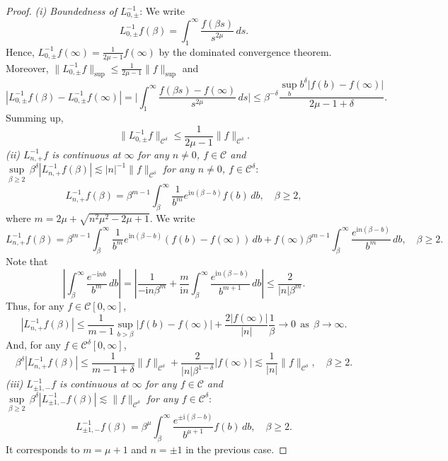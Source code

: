 \documentclass[10pt,a4paper]{amsart}
\newcommand{\abs}[1]{\left\lvert #1 \right\rvert}
\newcommand{\mcal}{\mathcal}
\newcommand{\norm}[1]{\lVert #1 \rVert}
\begin{document}
\begin{proof}
\textit{(i) Boundedness of $L_{0,\pm}^{-1}$}: We write
\[L_{0,\pm}^{-1} f(\beta) = \int_1^\infty \frac{f(\beta s)}{s^{2\mu}} \,ds.\]
Hence, $L_{0,\pm}^{-1} f(\infty) = \frac{1}{2\mu-1} f(\infty)$ by the dominated convergence theorem. Moreover, $\norm{L_{0,\pm}^{-1} f}_{\sup} \leq \frac{1}{2\mu-1} \norm{f}_{\sup}$ and
\[|L_{0,\pm}^{-1} f(\beta) - L_{0,\pm}^{-1} f(\infty)| = \bigg|\int_1^\infty \frac{f(\beta s) - f(\infty)}{s^{2\mu}} \,ds \bigg| \leq \beta^{-\delta} \frac{\sup_{b} b^\delta |f(b) - f(\infty)| }{2\mu -1+ \delta}.\]
Summing up,
\[\norm{L_{0,\pm}^{-1} f}_{\mcal{C}^\delta} \leq \frac{1}{2\mu - 1} \norm{f}_{\mcal{C}^\delta}.\]
\textit{(ii) $L_{n,+}^{-1} f$ is continuous at $\infty$ for any $n\neq 0$, $f\in \mcal{C}$ and $\underset{\beta \geq 2}{\sup} \,\beta^\delta |L_{n,+}^{-1} f(\beta)| \lesssim |n|^{-1} \norm{f}_{\mcal{C}^\delta}$ for any $n\neq 0$, $f\in\mcal{C}^\delta$}:
\[L_{n,+}^{-1} f(\beta) = \beta^{m - 1} \int_\beta^\infty \frac{1}{b^{m}} e^{\textrm{i}n (\beta - b)} f(b) \,db, \quad \beta \geq 2,\]
where $m = 2\mu + \sqrt{n^2\mu^2 - 2\mu +1}$. We write
\[L_{n,+}^{-1} f(\beta) = \beta^{m - 1} \int_\beta^\infty \frac{1}{b^{m}} e^{\textrm{i}n (\beta - b)} (f(b) - f(\infty)) \,db + f(\infty) \beta^{m-1} \int_\beta^\infty \frac{e^{\textrm{i}n(\beta - b)}}{b^m} \,db, \quad \beta \geq 2.\]
Note that
\[\abs{\int_\beta^\infty \frac{e^{-\textrm{i}n b}}{b^m} \,db} = \abs{\frac{1}{-\textrm{i}n \beta^m} + \frac{m}{\textrm{i}n} \int_\beta^\infty \frac{e^{\textrm{i}n (\beta - b)}}{b^{m+1}} \,db} \leq \frac{2}{|n| \beta^{m}}.\]
Thus, for any $f\in \mcal{C}[0,\infty]$,
\[|L_{n,+}^{-1} f(\beta)| \leq \frac{1}{m-1} \sup_{b>\beta} |f(b) - f(\infty)| + \frac{2|f(\infty)|}{|n|} \frac{1}{\beta} \to 0~~\text{as}~~\beta\to\infty.\]
And, for any $f\in \mcal{C}^\delta[0,\infty]$,
\[\beta^\delta |L_{n,+}^{-1} f(\beta)| \leq \frac{1}{m-1 + \delta} \norm{f}_{\mcal{C}^\delta} + \frac{2}{|n| \beta^{1 - \delta}} |f(\infty)| \lesssim \frac{1}{|n|} \norm{f}_{\mcal{C}^\delta}, \quad \beta \geq 2.\]
\textit{(iii) $L_{\pm 1,-}^{-1} f$ is continuous at $\infty$ for any $f\in \mcal{C}$ and $\underset{\beta \geq 2}{\sup} \,\beta^\delta |L_{\pm 1,-}^{-1} f(\beta)| \lesssim  \norm{f}_{\mcal{C}^\delta}$ for any $f\in \mcal{C}^\delta$}:
\[L_{\pm 1, -}^{-1} f(\beta) = \beta^\mu \int_\beta^\infty \frac{e^{\pm \textrm{i}(\beta - b)}}{b^{\mu + 1}} f(b) \,db, \quad \beta \geq 2.\]
It corresponds to $m = \mu + 1$ and $n = \pm 1$ in the previous case.


\end{proof}
\end{document}
